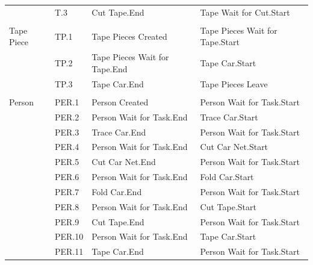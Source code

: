 \documentclass[
  10pt,
  a4paperpaper,
  DIV=11,
  numbers=noendperiod,
  oneside]{scrreprt}
\begin{document}
\begin{table}[H]
{\begin{tabular}{p{2.4cm}>{\raggedright\arraybackslash}p{1.2cm}>{\raggedright\arraybackslash}p{5.9cm}>{\raggedright\arraybackslash}p{5.9cm}}
       & T.3 & Cut Tape.End & Tape Wait for Cut.Start \\
       &      &              &              \\
Tape Piece & TP.1 & Tape Pieces Created & Tape Pieces Wait for Tape.Start \\
           & TP.2 & Tape Pieces Wait for Tape.End & Tape Car.Start \\
           & TP.3 & Tape Car.End & Tape Pieces Leave \\
     &      &              &              \\
Person & PER.1 & Person Created & Person Wait for Task.Start \\
       & PER.2 & Person Wait for Task.End & Trace Car.Start \\
       & PER.3 & Trace Car.End & Person Wait for Task.Start \\
       & PER.4 & Person Wait for Task.End & Cut Car Net.Start \\
       & PER.5 & Cut Car Net.End & Person Wait for Task.Start \\
       & PER.6 & Person Wait for Task.End & Fold Car.Start \\
       & PER.7 & Fold Car.End & Person Wait for Task.Start \\
       & PER.8 & Person Wait for Task.End & Cut Tape.Start \\
       & PER.9 & Cut Tape.End & Person Wait for Task.Start \\
       & PER.10 & Person Wait for Task.End & Tape Car.Start \\
       & PER.11 & Tape Car.End & Person Wait for Task.Start \\\bottomrule
\end{tabular}

}

\end{table}%
\end{document}
